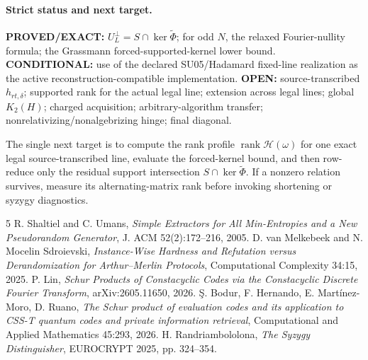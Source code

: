 \documentclass[11pt]{article}
\begin{document}
\paragraph{Strict status and next target.}
\textbf{PROVED/EXACT:} $U_L^\perp=S\cap\ker\widetilde\Phi$; for odd $N$, the relaxed Fourier-nullity formula; the Grassmann forced-supported-kernel lower bound.
\textbf{CONDITIONAL:} use of the declared SU05/Hadamard fixed-line realization as the active reconstruction-compatible implementation.
\textbf{OPEN:} source-transcribed $h_{rt,\delta}$; supported rank for the actual legal line; extension across legal lines; global $K_2(H)$; charged acquisition; arbitrary-algorithm transfer; nonrelativizing/nonalgebrizing hinge; final diagonal.

The single next target is to compute the rank profile $\operatorname{rank}\mathcal H(\omega)$ for one exact legal source-transcribed line, evaluate the forced-kernel bound, and then row-reduce only the residual support intersection $S\cap\ker\widetilde\Phi$. If a nonzero relation survives, measure its alternating-matrix rank before invoking shortening or syzygy diagnostics.

\begin{thebibliography}{5}
 R. Shaltiel and C. Umans, \emph{Simple Extractors for All Min-Entropies and a New Pseudorandom Generator}, J. ACM 52(2):172--216, 2005.
 D. van Melkebeek and N. Mocelin Sdroievski, \emph{Instance-Wise Hardness and Refutation versus Derandomization for Arthur--Merlin Protocols}, Computational Complexity 34:15, 2025.
 P. Lin, \emph{Schur Products of Constacyclic Codes via the Constacyclic Discrete Fourier Transform}, arXiv:2605.11650, 2026.
 \c{S}. Bodur, F. Hernando, E. Mart\'inez-Moro, D. Ruano, \emph{The Schur product of evaluation codes and its application to CSS-T quantum codes and private information retrieval}, Computational and Applied Mathematics 45:293, 2026.
 H. Randriambololona, \emph{The Syzygy Distinguisher}, EUROCRYPT 2025, pp. 324--354.
\end{thebibliography}
\end{document}
